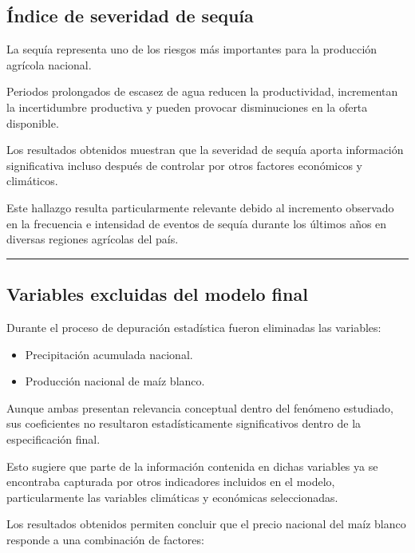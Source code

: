\documentclass[11pt]{article}
\providecommand{\tightlist}{%
      \setlength{\itemsep}{0pt}\setlength{\parskip}{0pt}}
\begin{document}
\hypertarget{uxedndice-de-severidad-de-sequuxeda}{%
\subsection{Índice de severidad de
sequía}\label{uxedndice-de-severidad-de-sequuxeda}}

La sequía representa uno de los riesgos más importantes para la
producción agrícola nacional.

Periodos prolongados de escasez de agua reducen la productividad,
incrementan la incertidumbre productiva y pueden provocar disminuciones
en la oferta disponible.

Los resultados obtenidos muestran que la severidad de sequía aporta
información significativa incluso después de controlar por otros
factores económicos y climáticos.

Este hallazgo resulta particularmente relevante debido al incremento
observado en la frecuencia e intensidad de eventos de sequía durante los
últimos años en diversas regiones agrícolas del país.

\begin{center}\rule{0.5\linewidth}{0.5pt}\end{center}

\hypertarget{variables-excluidas-del-modelo-final}{%
\subsection{Variables excluidas del modelo
final}\label{variables-excluidas-del-modelo-final}}

Durante el proceso de depuración estadística fueron eliminadas las
variables:

\begin{itemize}
\tightlist
\item
  Precipitación acumulada nacional.
\item
  Producción nacional de maíz blanco.
\end{itemize}

Aunque ambas presentan relevancia conceptual dentro del fenómeno
estudiado, sus coeficientes no resultaron estadísticamente
significativos dentro de la especificación final.

Esto sugiere que parte de la información contenida en dichas variables
ya se encontraba capturada por otros indicadores incluidos en el modelo,
particularmente las variables climáticas y económicas seleccionadas.

Los resultados obtenidos permiten concluir que el precio nacional del
maíz blanco responde a una combinación de factores:
\end{document}
